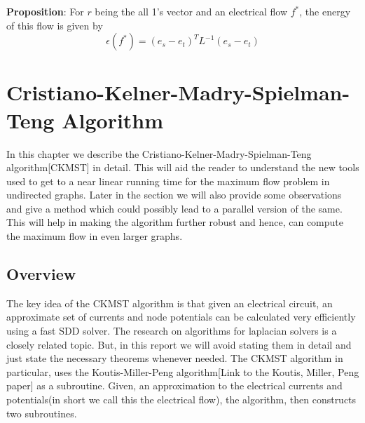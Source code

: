 \documentclass[BTech]{iitmdiss}
\begin{document}
		   \textbf{Proposition}: For $r$ being the all 1's vector and an electrical flow $f^{\ast}$, the energy of this flow is given by
		      $$\epsilon(f^{\ast}) = (e_s - e_t)^T L^{-1} (e_s-e_t)$$
		
		
		
	      
	      
	 \chapter{Cristiano-Kelner-Madry-Spielman-Teng Algorithm}
	    In this chapter we describe the Cristiano-Kelner-Madry-Spielman-Teng algorithm[CKMST] in detail. This will aid the reader to understand
	 the new tools used to get to a near linear running time for the maximum flow problem in undirected graphs. Later in the section
	 we will also provide some observations and give a method which could possibly lead to a parallel version of the same. This will help in 
	 making the algorithm further robust and hence, can compute the maximum flow in even larger graphs.\\
	 
	 \section{Overview}
	    The key idea of the CKMST algorithm is that given an electrical circuit, an approximate set of currents and node potentials can be calculated
	 very efficiently using a fast SDD solver. The research on algorithms for laplacian solvers is a closely related topic. But, 
	 in this report we will avoid stating them in detail and just state the necessary theorems whenever needed. The CKMST algorithm in
	 particular, uses the Koutis-Miller-Peng algorithm[Link to the Koutis, Miller, Peng paper] as a subroutine. Given, an approximation to the 
	 electrical currents and potentials(in short we call this the electrical flow), the algorithm, then constructs two subroutines. 
	 
\end{document}
